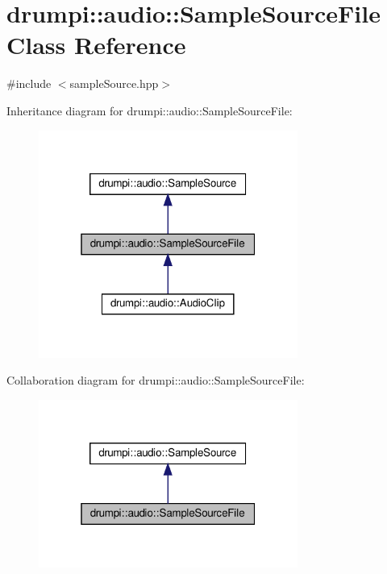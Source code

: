 \hypertarget{classdrumpi_1_1audio_1_1SampleSourceFile}{}\section{drumpi\+:\+:audio\+:\+:Sample\+Source\+File Class Reference}
\label{classdrumpi_1_1audio_1_1SampleSourceFile}


{\ttfamily \#include $<$sample\+Source.\+hpp$>$}



Inheritance diagram for drumpi\+:\+:audio\+:\+:Sample\+Source\+File\+:
\nopagebreak
\begin{figure}[H]
\begin{center}
\leavevmode
\includegraphics[width=241pt]{classdrumpi_1_1audio_1_1SampleSourceFile__inherit__graph}
\end{center}
\end{figure}


Collaboration diagram for drumpi\+:\+:audio\+:\+:Sample\+Source\+File\+:
\nopagebreak
\begin{figure}[H]
\begin{center}
\leavevmode
\includegraphics[width=241pt]{classdrumpi_1_1audio_1_1SampleSourceFile__coll__graph}
\end{center}
\end{figure}
